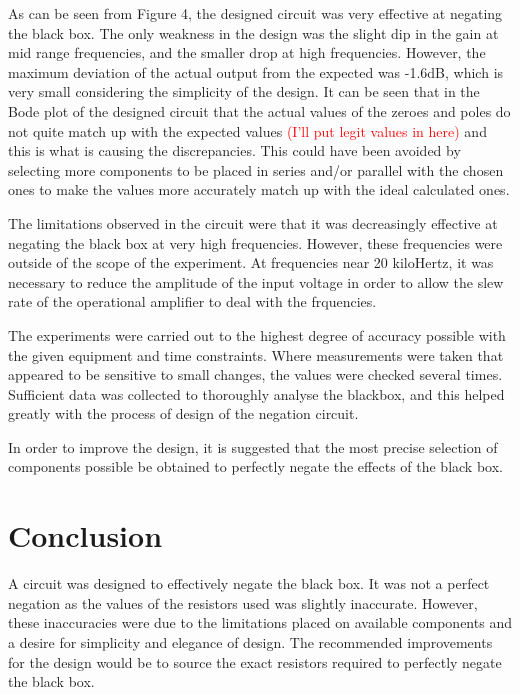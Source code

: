 \documentclass[12pt]{article} %
\begin{document}
As can be seen from Figure 4, the designed circuit was very effective at negating the black box. The only weakness in the design was the slight dip in the gain at mid range frequencies, and the smaller drop at high frequencies. However, the maximum deviation of the actual output from the expected was -1.6dB, which is very small considering the simplicity of the design. It can be seen that in the Bode plot of the designed circuit that the actual values of the zeroes and poles do not quite match up with the expected values \textcolor{red}{(I'll put legit values in here)} and this is what is causing the discrepancies. This could have been avoided by selecting more components to be placed in series and/or parallel with the chosen ones to make the values more accurately match up with the ideal calculated ones.

The limitations observed in the circuit were that it was decreasingly effective at negating the black box at very high frequencies. However, these frequencies were outside of the scope of the experiment. At frequencies near 20 kiloHertz, it was necessary to reduce the amplitude of the input voltage in order to allow the slew rate of the operational amplifier to deal with the frquencies.

The experiments were carried out to the highest degree of accuracy possible with the given equipment and time constraints. Where measurements were taken that appeared to be sensitive to small changes, the values were checked several times. Sufficient data was collected to thoroughly analyse the blackbox, and this helped greatly with the process of design of the negation circuit.

In order to improve the design, it is suggested that the most precise selection of components possible be obtained to perfectly negate the effects of the black box.

\pagebreak





\section{Conclusion}

A circuit was designed to effectively negate the black box. It was not a perfect negation as the values of the resistors used was slightly inaccurate. However, these inaccuracies were due to the limitations placed on available components and a desire for simplicity and elegance of design. The recommended improvements for the design would be to source the exact resistors required to perfectly negate the black box.
\end{document}
